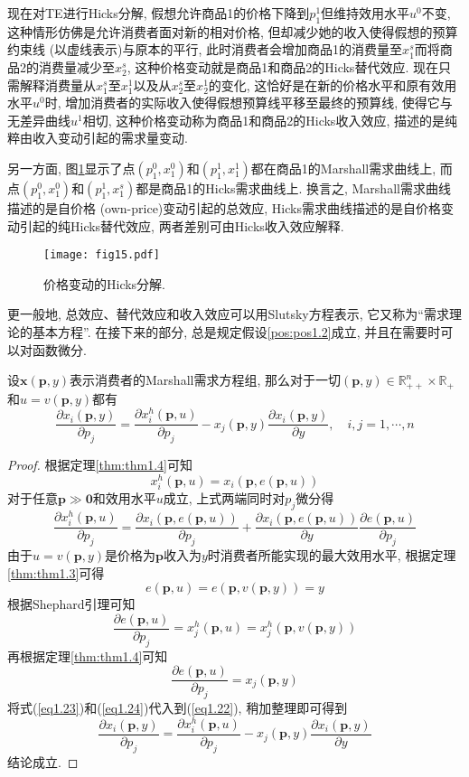 \documentclass[cn, 12pt, math=mtpro2, bibstyle=apa, blue, twocol]{elegantbook}
\newcommand{\R}{\mathbb{R}}
\newcommand{\p}{\mathbf{p}}
\newcommand{\x}{\mathbf{x}}
\begin{document}
现在对TE进行Hicks分解, 假想允许商品1的价格下降到$p_1^1$但维持效用水平$u^0$不变, 这种情形仿佛是允许消费者面对新的相对价格, 但却减少她的收入使得假想的预算约束线 (以虚线表示)与原本的平行, 此时消费者会增加商品1的消费量至$x_1^s$而将商品2的消费量减少至$x_2^s$, 这种价格变动就是商品1和商品2的Hicks替代效应. 现在只需解释消费量从$x_1^s$至$x_1^1$以及从$x_2^s$至$x_2^1$的变化, 这恰好是在新的价格水平和原有效用水平$u^0$时, 增加消费者的实际收入使得假想预算线平移至最终的预算线, 使得它与无差异曲线$u^1$相切, 这种价格变动称为商品1和商品2的Hicks收入效应, 描述的是纯粹由收入变动引起的需求量变动.

另一方面, 图\ref{fig1.15}显示了点$(p_1^0,x_1^0)$和$(p_1^1,x_1^1)$都在商品1的Marshall需求曲线上, 而点$(p_1^0,x_1^0)$和$(p_1^1,x_1^s)$都是商品1的Hicks需求曲线上. 换言之, Marshall需求曲线描述的是自价格 (own-price)变动引起的总效应, Hicks需求曲线描述的是自价格变动引起的纯Hicks替代效应, 两者差别可由Hicks收入效应解释.
\begin{figure}
  \centering
  \texttt{[image: fig15.pdf]}
  \caption{价格变动的Hicks分解.}\label{fig1.15}
\end{figure}

更一般地, 总效应、替代效应和收入效应可以用Slutsky方程表示, 它又称为“需求理论的基本方程”. 在接下来的部分, 总是规定假设\ref{pos:pos1.2}成立, 并且在需要时可以对函数微分.

\begin{theorem}[Slutsky方程]
  设$\x(\p,y)$表示消费者的Marshall需求方程组, 那么对于一切$(\p,y)\in\R_{++}^n\times\R_+$和$u=v(\p,y)$都有
  $$\frac{\partial x_i(\p,y)}{\partial p_j}=\frac{\partial x_i^h(\p,u)}{\partial p_j}-x_j(\p,y)\frac{\partial x_i(\p,y)}{\partial y},\quad i,j=1,\cdots,n$$
\end{theorem}
\begin{proof}
  根据定理\ref{thm:thm1.4}可知
  $$x_i^h(\p,u)=x_i(\p,e(\p,u))$$
  对于任意$\p\gg\mathbf{0}$和效用水平$u$成立, 上式两端同时对$p_j$微分得
  \begin{equation}\label{eq1.22}
    \frac{\partial x_i^h(\p,u)}{\partial p_j}=\frac{\partial x_i(\p,e(\p,u))}{\partial p_j}+\frac{\partial x_i(\p,e(\p,u))}{\partial y}\frac{\partial e(\p,u)}{\partial p_j}
  \end{equation}
  由于$u=v(\p,y)$是价格为$\p$收入为$y$时消费者所能实现的最大效用水平, 根据定理\ref{thm:thm1.3}可得
  \begin{equation}\label{eq1.23}
    e(\p,u)=e(\p,v(\p,y))=y
  \end{equation}
  根据Shephard引理可知
  $$\frac{\partial e(\p,u)}{\partial p_j}=x_j^h(\p,u)=x_j^h(\p,v(\p,y))$$
  再根据定理\ref{thm:thm1.4}可知
  \begin{equation}\label{eq1.24}
    \frac{\partial e(\p,u)}{\partial p_j}=x_j(\p,y)
  \end{equation}
  将式(\ref{eq1.23})和(\ref{eq1.24})代入到(\ref{eq1.22}), 稍加整理即可得到
  $$\frac{\partial x_i(\p,y)}{\partial p_j}=\frac{\partial x_i^h(\p,u)}{\partial p_j}-x_j(\p,y)\frac{\partial x_i(\p,y)}{\partial y}$$
  结论成立.
\end{proof}
\end{document}
